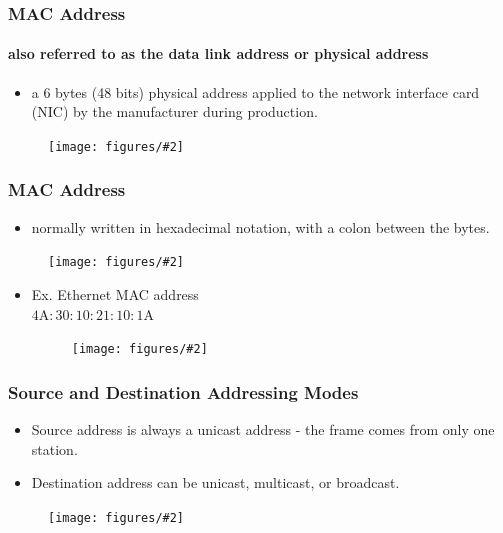 \documentclass{beamer}
\newcommand{\fig}[2]{
\begin{center}
\begin{figure}
\texttt{[image: figures/\#2]}
\end{figure}
\end{center}
}
\begin{document}
\begin{frame}
\frametitle{\huge MAC Address} 
\framesubtitle{also referred to as the data link address or physical address}
\begin{itemize} 
\Large
\item <1-> a 6 bytes (48 bits) physical address applied to the network interface card (NIC) by the manufacturer during production.
\end{itemize}
\fig{0.35}{network_adapter}
\end{frame} 



\begin{frame}
\frametitle{\huge MAC Address} 
\begin{itemize} 
\Large
\item <1-> normally written in hexadecimal notation, with a colon between the bytes.
\end{itemize}
\fig{0.8}{network_macaddress}
\begin{itemize} 
\Large
\item <2-> Ex. Ethernet MAC address \\
\qquad   $4$A$:30:10:21:10:1$A 
\fig{0.5}{network_macaddress2}
\end{itemize}
\end{frame} 


\begin{frame}
\frametitle{\huge Source and Destination Addressing Modes} 
\begin{itemize} 
\Large
\item <1-> Source address is always a unicast address - the frame comes from only one station.
\item <2-> Destination address can be unicast, multicast, or broadcast.
\end{itemize}
\fig{0.6}{network_unimulti}
\end{frame} 



\end{document}
